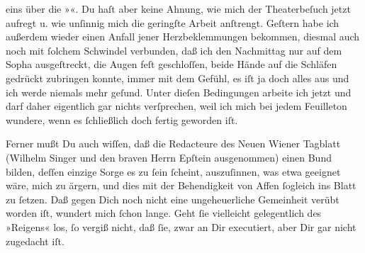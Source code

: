                eins über die »\label{K_L01282-4v}\label{K_L01282-4}«. Du haſt aber keine Ahnung, wie
               mich der Theaterbeſuch jetzt aufregt u. wie unſinnig mich die geringſte Arbeit {\pb}anſtrengt. Geſtern habe ich außerdem wieder einen
               Anfall jener Herzbeklemmungen bekommen, diesmal auch noch mit ſolchem Schwindel
               verbunden, daß ich den Nachmittag nur auf dem Sopha ausgeſtreckt, die Augen feſt
               geschloſſen, beide Hände auf die Schläfen gedrückt zubringen konnte, immer mit dem
               Gefühl, es iſt ja doch alles aus und ich werde niemals mehr geſund. Unter dieſen
               Bedingungen arbeite ich jetzt und darf daher eigentlich gar nichts verſprechen, weil
               ich mich bei jedem Feuilleton wundere, wenn es ſchließlich doch fertig geworden
               iſt.\pend
           
\pstart
           Ferner mußt Du auch wiſſen, daß die Redacteure des {\pb}Neuen Wiener Tagblatt (Wilhelm Singer und den braven Herrn Epſtein ausgenommen) einen Bund bilden, deſſen einzige Sorge es
               zu ſein ſcheint, auszuſinnen, was etwa geeignet wäre, mich zu ärgern, und dies mit
               der Behendigkeit von Affen ſogleich ins Blatt zu ſetzen. Daß gegen Dich noch nicht
               eine ungeheuerliche Gemeinheit verübt worden iſt, wundert mich ſchon lange. Geht ſie
               vielleicht gelegentlich des »Reigens« los, ſo
               vergiß nicht, daß ſie, zwar an Dir executiert, aber Dir gar nicht zugedacht iſt.\pend
           
